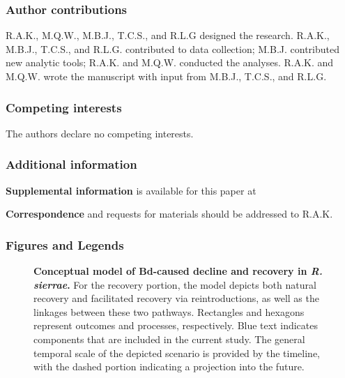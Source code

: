 \documentclass[
  letterpaper,
  DIV=11,
  numbers=noendperiod]{scrartcl}
\begin{document}
\subsubsection{Author contributions}\label{author-contributions}

R.A.K., M.Q.W., M.B.J., T.C.S., and R.L.G designed the research. R.A.K.,
M.B.J., T.C.S., and R.L.G. contributed to data collection; M.B.J.
contributed new analytic tools; R.A.K. and M.Q.W. conducted the
analyses. R.A.K. and M.Q.W. wrote the manuscript with input from M.B.J.,
T.C.S., and R.L.G.

\subsubsection{\texorpdfstring{\textbf{Competing
interests}}{Competing interests}}\label{competing-interests}

The authors declare no competing interests.

\subsubsection{Additional information}\label{additional-information}

\textbf{Supplemental information} is available for this paper at

\textbf{Correspondence} and requests for materials should be addressed
to R.A.K.

\newpage

\subsubsection{Figures and Legends}\label{figures-and-legends}

\begin{figure}


\caption{\label{fig-recovery-model}\textbf{Conceptual model of Bd-caused
decline and recovery in \emph{R. sierrae}.} For the recovery portion,
the model depicts both natural recovery and facilitated recovery via
reintroductions, as well as the linkages between these two pathways.
Rectangles and hexagons represent outcomes and processes, respectively.
Blue text indicates components that are included in the current study.
The general temporal scale of the depicted scenario is provided by the
timeline, with the dashed portion indicating a projection into the
future.}

\end{figure}%
\end{document}
